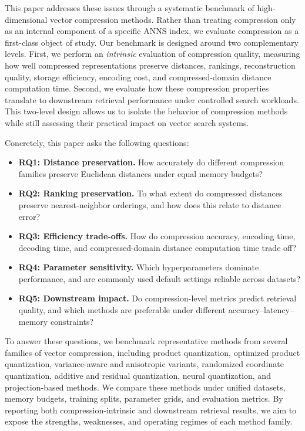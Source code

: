 \documentclass[sigconf]{acmart}
\begin{document}
This paper addresses these issues through a systematic benchmark of high-dimensional vector compression methods. 
Rather than treating compression only as an internal component of a specific ANNS index, we evaluate compression as a first-class object of study. 
Our benchmark is designed around two complementary levels. 
First, we perform an \emph{intrinsic} evaluation of compression quality, measuring how well compressed representations preserve distances, rankings, reconstruction quality, storage efficiency, encoding cost, and compressed-domain distance computation time. 
Second, we evaluate how these compression properties translate to downstream retrieval performance under controlled search workloads. 
This two-level design allows us to isolate the behavior of compression methods while still assessing their practical impact on vector search systems.

Concretely, this paper asks the following questions:

\begin{itemize}
    \item \textbf{RQ1: Distance preservation.} 
    How accurately do different compression families preserve Euclidean distances under equal memory budgets?

    \item \textbf{RQ2: Ranking preservation.} 
    To what extent do compressed distances preserve nearest-neighbor orderings, and how does this relate to distance error?

    \item \textbf{RQ3: Efficiency trade-offs.} 
    How do compression accuracy, encoding time, decoding time, and compressed-domain distance computation time trade off?

    \item \textbf{RQ4: Parameter sensitivity.} 
    Which hyperparameters dominate performance, and are commonly used default settings reliable across datasets?

    \item \textbf{RQ5: Downstream impact.} 
    Do compression-level metrics predict retrieval quality, and which methods are preferable under different accuracy--latency--memory constraints?
\end{itemize}

To answer these questions, we benchmark representative methods from several families of vector compression, including product quantization, optimized product quantization, variance-aware and anisotropic variants, randomized coordinate quantization, additive and residual quantization, neural quantization, and projection-based methods. 
We compare these methods under unified datasets, memory budgets, training splits, parameter grids, and evaluation metrics. 
By reporting both compression-intrinsic and downstream retrieval results, we aim to expose the strengths, weaknesses, and operating regimes of each method family.
\end{document}
